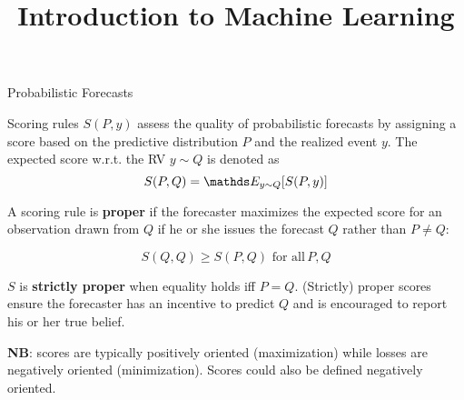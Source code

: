 \documentclass[11pt,compress,t,notes=noshow, xcolor=table]{beamer}
\title{Introduction to Machine Learning}
\begin{document}
    

\begin{vbframe}{Probabilistic Forecasts }

Scoring rules $S(P,y)$ assess the quality of probabilistic forecasts by assigning a score based on the predictive distribution $P$ and the realized event $y$. The expected score w.r.t. the RV $y \sim Q$ is denoted as 
$$ S(P,Q) = \E_{y \sim Q}[S(P,y)]$$



A scoring rule is \textbf{proper} if the forecaster maximizes the expected score for an observation drawn from $Q$ if he or she issues the forecast $Q$ rather than $P \neq Q$:

$$S(Q,Q) \geq S(P,Q) \,\, \text{for all} \, P,Q $$

\vspace{0.2cm}

$S$ is \textbf{strictly proper} when equality holds iff $P=Q$. (Strictly) proper scores ensure the forecaster has an incentive to predict $Q$ and is encouraged to report his or her true belief.

\vspace{0.2cm}

{\footnotesize \textbf{NB}: scores are typically positively oriented (maximization) while losses are negatively oriented (minimization). Scores could also be defined negatively oriented.}

\end{vbframe}
\end{document}
